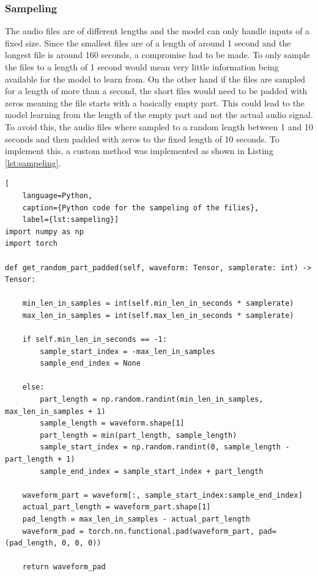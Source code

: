 \subsubsection{Sampeling}%
The audio files are of different lengths and the model can only handle inputs of a fixed size.
Since the smallest files are of a length of around 1 second and the longest file is around
160 seconds, a compromise had to be made. To only sample the files to a length of 1 second
would mean very little information being available for the model to learn from. On the other
hand if the files are sampled for a length of more than a second, the short files would need
to be padded with zeros meaning the file starts with a basically empty part. This could lead
to the model learning from the length of the empty part and not the actual audio signal.
To avoid this, the audio files where sampled to a random length between 1 and 10 seconds and
then padded with zeros to the fixed length of 10 seconds. To implement this, a custom method
was implemented as shown in Listing \ref{lst:sampeling}.

\begin{lstlisting}[
    language=Python, 
    caption={Python code for the sampeling of the filies}, 
    label={lst:sampeling}]
import numpy as np
import torch

def get_random_part_padded(self, waveform: Tensor, samplerate: int) -> Tensor:

    min_len_in_samples = int(self.min_len_in_seconds * samplerate)
    max_len_in_samples = int(self.max_len_in_seconds * samplerate)

    if self.min_len_in_seconds == -1:
        sample_start_index = -max_len_in_samples
        sample_end_index = None

    else:
        part_length = np.random.randint(min_len_in_samples, max_len_in_samples + 1)
        sample_length = waveform.shape[1]
        part_length = min(part_length, sample_length)
        sample_start_index = np.random.randint(0, sample_length - part_length + 1)
        sample_end_index = sample_start_index + part_length

    waveform_part = waveform[:, sample_start_index:sample_end_index]
    actual_part_length = waveform_part.shape[1]
    pad_length = max_len_in_samples - actual_part_length
    waveform_pad = torch.nn.functional.pad(waveform_part, pad=(pad_length, 0, 0, 0))

    return waveform_pad
\end{lstlisting}


